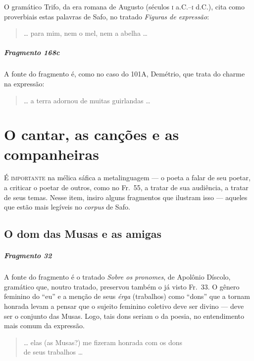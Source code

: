 {\small O gramático Trifo, da era romana de Augusto (séculos \textsc{i} a.C.--\textsc{i} d.C.), 
cita como proverbiais estas palavras de Safo, no tratado \textit{Figuras de expressão}:}

\begin{verse}
\ldots{} para mim, nem o mel, nem a abelha \ldots{}
\end{verse}

\paragraph{Fragmento 168c}

{\small A fonte do fragmento é, como no caso do 101A, Demétrio, que trata do charme na
expressão:}

\begin{verse}
\ldots{} a terra adornou de muitas guirlandas \ldots{}
\end{verse}


\chapter[O cantar, as canções e as companheiras]{O cantar, as canções e as companheiras}

\textsc{É importante} na mélica sáfica a metalinguagem --- o poeta a falar de seu
poetar, a criticar o poetar de outros, como no Fr.~55, a tratar de sua
audiência, a tratar de seus temas. Nesse item, insiro alguns fragmentos que
ilustram isso --- aqueles que estão mais legíveis no \textit{corpus} de Safo.

\section{O dom das Musas e as amigas}

\paragraph{Fragmento 32}

{\small A fonte do fragmento é o tratado \textit{Sobre os pronomes}, de Apolônio
Díscolo, gramático que, noutro tratado, preservou também o já visto Fr.~33. O
gênero feminino do “eu” e a menção de seus \textit{érga }(trabalhos) como
``dons” que a tornam honrada levam a pensar que o sujeito feminino
coletivo deve ser divino --- deve ser o conjunto das Musas. Logo, tais dons
seriam o da poesia, no entendimento mais comum da expressão.}

\begin{verse}
\ldots{} elas (as Musas?) me fizeram honrada com os \qb{}dons\\
de seus trabalhos \ldots{}
\end{verse}

